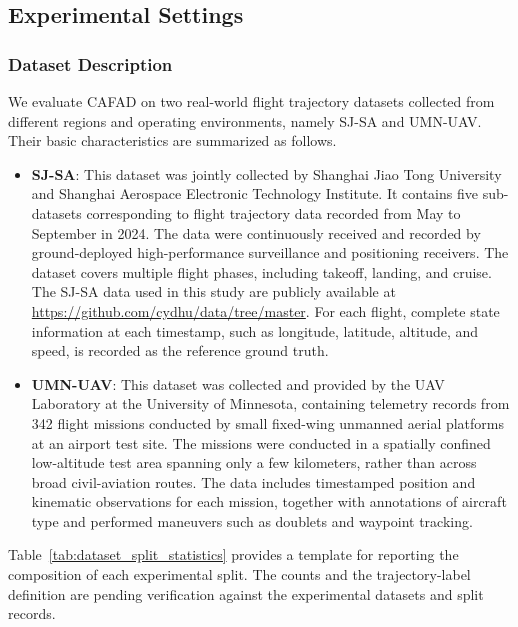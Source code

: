 \documentclass[iicol,pdflatex,sn-basic,Numbered]{sn-jnl}%
\theoremstyle{thmstyleone}%
\theoremstyle{thmstyletwo}%
\theoremstyle{thmstylethree}%
\begin{document}
\subsection{Experimental Settings}

\subsubsection{Dataset Description}
\label{sec:dataset}

We evaluate CAFAD on two real-world flight trajectory datasets collected from different regions and operating environments, namely SJ-SA and UMN-UAV\cite{umn_uav_dataset}.
Their basic characteristics are summarized as follows.

\begin{itemize}
\item \textbf{SJ-SA}: This dataset was jointly collected by Shanghai Jiao Tong University and Shanghai Aerospace Electronic Technology Institute.
It contains five sub-datasets corresponding to flight trajectory data recorded from May to September in 2024.
The data were continuously received and recorded by ground-deployed high-performance surveillance and positioning receivers.
The dataset covers multiple flight phases, including takeoff, landing, and cruise.
The SJ-SA data used in this study are publicly available at \url{https://github.com/cydhu/data/tree/master}.
For each flight, complete state information at each timestamp, such as longitude, latitude, altitude, and speed, is recorded as the reference ground truth.

\item \textbf{UMN-UAV}: This dataset was collected and provided by the UAV Laboratory at the University of Minnesota, containing telemetry records from 342 flight missions conducted by small fixed-wing unmanned aerial platforms at an airport test site.
The missions were conducted in a spatially confined low-altitude test area spanning only a few kilometers, rather than across broad civil-aviation routes.
The data includes timestamped position and kinematic observations for each mission, together with annotations of aircraft type and performed maneuvers such as doublets and waypoint tracking.
\end{itemize}

Table~\ref{tab:dataset_split_statistics} provides a template for reporting the composition of each experimental split. The counts and the trajectory-label definition are pending verification against the experimental datasets and split records.
\end{document}
